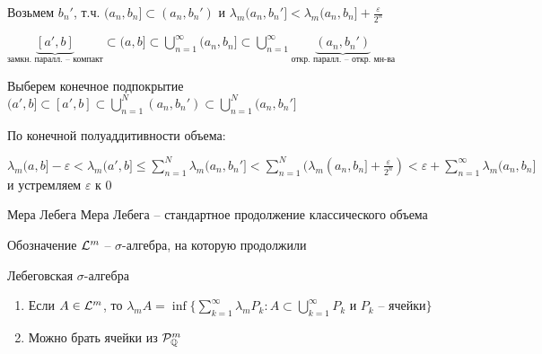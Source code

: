 \documentclass[12pt]{article}
\begin{document}
Возьмем $b_n'$, т.ч. $(a_n, b_n] \subset (a_n, b_n')$ и $\lambda_m (a_n, b_n'] < \lambda_m (a_n, b_n] + \frac{\varepsilon}{2^n}$

$\underbrace{[a', b]}_\text{замкн. паралл. -- компакт} \subset (a, b] \subset \bigcup\limits_{n = 1}^\infty (a_n, b_n] \subset \bigcup\limits_{n = 1}^\infty \underbrace{(a_n, b_n')}_\text{откр. паралл. -- откр. мн-ва}$

Выберем конечное подпокрытие $(a', b] \subset [a', b] \subset \bigcup\limits_{n = 1}^N (a_n, b_n') \subset \bigcup\limits_{n = 1}^N (a_n, b_n']$

По конечной полуаддитивности объема:

$\lambda_m (a, b] - \varepsilon < \lambda_m (a', b] \leq \sum\limits_{n = 1}^N \lambda_m (a_n, b_n'] < \sum\limits_{n = 1}^N (\lambda_m (a_n, b_n] + \frac{\varepsilon}{2^n}) < \varepsilon + \sum\limits_{n = 1}^\infty \lambda_m (a_n, b_n]$ и устремляем $\varepsilon$ к $0$

\begin{defin}{Мера Лебега}
    Мера Лебега -- стандартное продолжение классического объема
\end{defin}

\begin{declar}{Обозначение}
    $\mathcal{L}^m$ -- $\sigma$-алгебра, на которую продолжили

    Лебеговская $\sigma$-алгебра
\end{declar}

\begin{Remark}{}
    \begin{enumerate}
        \item Если $A \in \mathcal{L}^m$, то $\lambda_m A = \inf \{\sum\limits_{k = 1}^\infty \lambda_m P_k : A \subset \bigcup\limits_{k = 1}^\infty P_k \text{ и } P_k \text{ -- ячейки} \}$
        \item Можно брать ячейки из $\mathcal{P}^m_\mathbb Q$
    \end{enumerate}
\end{Remark}
\end{document}
